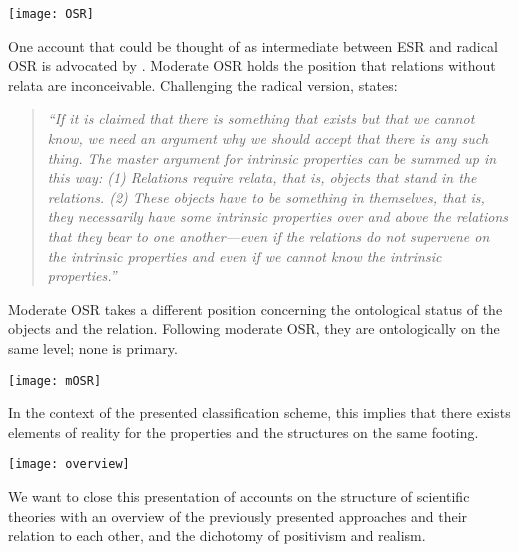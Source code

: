 \documentclass{article}
\begin{document}
\begin{minipage}{\textwidth}
\centering
\texttt{[image: OSR]}
\end{minipage}
\bigskip

One account that could be thought of as intermediate between ESR and radical OSR is advocated by \cite[]{esfeld2008moderate}. Moderate OSR holds the position that relations without relata are inconceivable. Challenging the radical version, \cite[p.29]{esfeld2008moderate} states:


\begin{quote}
\textit{``If it is claimed that there is something that exists but that we cannot know, we need an argument why we should accept that there is any such thing. The master argument for intrinsic properties can be summed up in this way:\newline
(1) Relations require relata, that is, objects that stand in the relations. \newline
(2) These objects have to be something in themselves, that is, they necessarily have
some intrinsic properties over and above the relations that they bear to one
another—even if the relations do not supervene on the intrinsic properties and
even if we cannot know the intrinsic properties.''}
\end{quote}

Moderate OSR takes a different position concerning the ontological status of the objects and the relation. Following moderate OSR, they are ontologically on the same level; none is primary. 

\begin{minipage}{\textwidth}
\centering
\texttt{[image: mOSR]}
\end{minipage}
\bigskip

In the context of the presented classification scheme, this implies that there exists elements of reality for the properties and the structures on the same footing. 




\begin{minipage}{\textwidth}
\centering
\texttt{[image: overview]}
\end{minipage}
\bigskip

We want to close this presentation of accounts on the structure of scientific theories with an overview of the previously presented approaches and their relation to each other, and the dichotomy of positivism and realism. 
\end{document}
